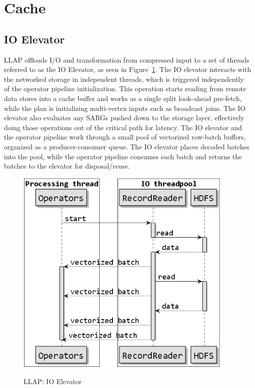\section{Cache}

\subsection{IO Elevator}

LLAP offloads I/O and transformation from compressed input to a set of threads referred to as the IO Elevator, as seen in Figure~\ref{fig:elevator}.
The IO elevator interacts with the networked storage in independent threads, which is triggered independently
of the operator pipeline initialization.  This operation starts reading from remote data stores into a cache 
buffer and works as a single split look-ahead pre-fetch, while the plan is initializing multi-vertex inputs
such as broadcast joins.
The 
IO elevator also evaluates any SARGs pushed down to the storage layer, effectively doing those operations 
out of the critical path for latency.
The IO elevator and the operator pipeline work through a small pool of vectorized row-batch buffers, organized
as a producer-consumer queue. The IO elevator places decoded batches into the pool, while the operator pipeline
consumes each batch and returns the batches to the elevator for disposal/reuse.

\begin{figure}[ht]
\centering
\includegraphics[width=0.8\columnwidth]{figures/elevator.png}
\caption{LLAP: IO Elevator}
\label{fig:elevator}
\end{figure} 

